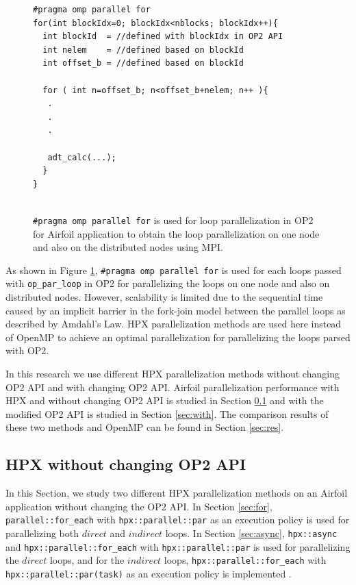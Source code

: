 \documentclass[conference]{IEEEtran}
\begin{document}
\begin{figure} [!h]
    \begin{lstlisting}
#pragma omp parallel for
for(int blockIdx=0; blockIdx<nblocks; blockIdx++){
  int blockId  = //defined with blockIdx in OP2 API
  int nelem    = //defined based on blockId 
  int offset_b = //defined based on blockId
        
  for ( int n=offset_b; n<offset_b+nelem; n++ ){
   .
   .
   .

   adt_calc(...);
  }
}
  
    \end{lstlisting}
    \caption{\small{\texttt{\#pragma omp parallel for} is used for loop parallelization in OP2 for Airfoil application to obtain the loop parallelization on one node and also on the distributed nodes using MPI.}}
    \label{l2}
\end{figure}


As shown in Figure \ref{l2}, \texttt{\#pragma omp parallel for} is used for each loops passed with \texttt{op\_par\_loop} in OP2 for parallelizing the loops on one node and also on distributed nodes. However, scalability is limited due to the sequential time caused by an implicit barrier in the fork-join model \cite{r23} between the parallel loops as described by Amdahl's Law. HPX parallelization methods are used here instead of OpenMP to achieve an optimal parallelization for parallelizing the loops parsed with OP2. 

In this research we use different HPX parallelization methods without changing OP2 API and with changing OP2 API. Airfoil parallelization performance with HPX and without changing OP2 API is studied in Section \ref{sec:without} and with the modified OP2 API is studied in Section \ref{sec:with}. The comparison results of these two methods and OpenMP can be found in Section \ref{sec:res}.

\subsection{\textbf{HPX without changing OP2 API}}
\label{sec:without}

In this Section, we study two different HPX parallelization methods on an Airfoil application without changing the OP2 API. In Section \ref{sec:for}, \texttt{parallel::for\_each} with \texttt{hpx::parallel::par} as an execution policy is used for parallelizing both $direct$ and $indirect$ loops. In Section \ref{sec:async}, \texttt{hpx::async} and \texttt{hpx::parallel::for\_each} with \texttt{hpx::parallel::par} is used for parallelizing the $direct$ loops, and for the $indirect$ loops, \texttt{hpx::parallel::for\_each} with \texttt{hpx::parallel::par(task)} as an execution policy is implemented . 
\end{document}
